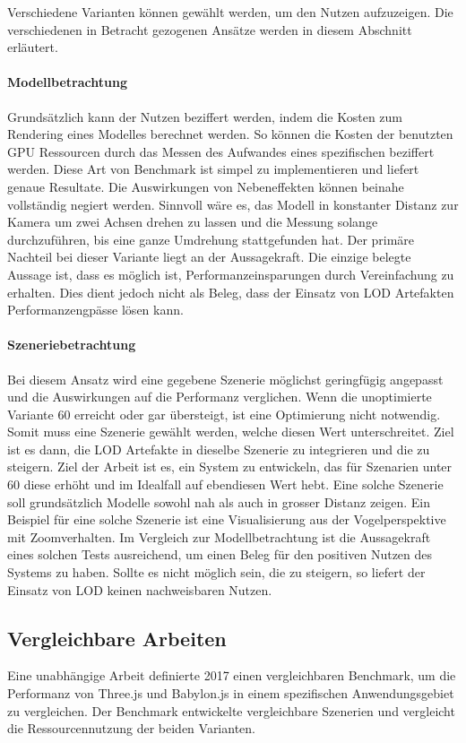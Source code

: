Verschiedene Varianten können gewählt werden, um den Nutzen aufzuzeigen. Die verschiedenen in Betracht gezogenen Ansätze werden in diesem Abschnitt erläutert.

\paragraph{Modellbetrachtung}
Grundsätzlich kann der Nutzen beziffert werden, indem die Kosten zum Rendering eines Modelles berechnet werden. So können die Kosten der benutzten GPU Ressourcen durch das Messen des Aufwandes eines spezifischen  beziffert werden. Diese Art von Benchmark ist simpel zu implementieren und liefert genaue Resultate. Die Auswirkungen von Nebeneffekten können beinahe vollständig negiert werden.
Sinnvoll wäre es, das Modell in konstanter Distanz zur Kamera um zwei Achsen drehen zu lassen und die Messung solange durchzuführen, bis eine ganze Umdrehung stattgefunden hat.
Der primäre Nachteil bei dieser Variante liegt an der Aussagekraft. Die einzige belegte Aussage ist, dass es möglich ist, Performanzeinsparungen durch Vereinfachung zu erhalten. Dies dient jedoch nicht als Beleg, dass der Einsatz von LOD Artefakten Performanzengpässe lösen kann.

\paragraph{Szeneriebetrachtung}
Bei diesem Ansatz wird eine gegebene Szenerie möglichst geringfügig angepasst und die Auswirkungen auf die Performanz verglichen.
Wenn die unoptimierte Variante 60  erreicht oder gar übersteigt, ist eine Optimierung nicht notwendig. Somit muss eine Szenerie gewählt werden, welche diesen Wert unterschreitet.
Ziel ist es dann, die LOD Artefakte in dieselbe Szenerie zu integrieren und die  zu steigern. Ziel der Arbeit ist es, ein System zu entwickeln, das für Szenarien unter 60  diese erhöht und im Idealfall auf ebendiesen Wert hebt.
Eine solche Szenerie soll grundsätzlich Modelle sowohl nah als auch in grosser Distanz zeigen. Ein Beispiel für eine solche Szenerie ist eine Visualisierung aus der Vogelperspektive mit Zoomverhalten.
Im Vergleich zur Modellbetrachtung ist die Aussagekraft eines solchen Tests ausreichend, um einen Beleg für den positiven Nutzen des Systems zu haben. Sollte es nicht möglich sein, die  zu steigern, so liefert der Einsatz von LOD keinen nachweisbaren Nutzen.

\subsection{Vergleichbare Arbeiten}
Eine unabhängige Arbeit definierte 2017 einen vergleichbaren Benchmark, um die Performanz von Three.js und Babylon.js in einem spezifischen Anwendungsgebiet zu vergleichen. Der Benchmark entwickelte vergleichbare Szenerien und vergleicht die Ressourcennutzung der beiden Varianten. \cite{performanceComparisonBabylonThreejs}

